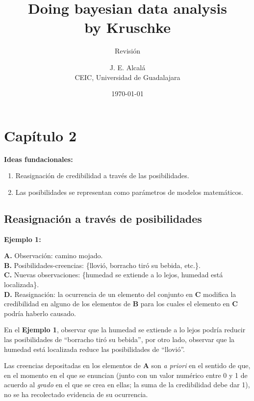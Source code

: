 \documentclass{scrartcl}
\title{\color{tit} Doing bayesian data analysis\\
		by Kruschke}
\subtitle{Revisión}
\author{\normalsize J. E. Alcalá \\
		\normalsize CEIC, Universidad de Guadalajara}
\date{\today}
\begin{document}
\maketitle 
	\section{Capítulo 2}
	
	\textsf{\textbf{Ideas fundacionales:}}
	
	\begin{enumerate}

		\item Reasignación de credibilidad a través de las posibilidades.
		\item Las posibilidades se representan como parámetros de modelos matemáticos.
	
	\end{enumerate}
	
	\subsection{Reasignación a través de posibilidades}
		\begin{tcolorbox}
		\textsf{\textbf{Ejemplo 1:}}		
		
			\textbf{A.} Observación: camino mojado. \\
			\textbf{B.} Posibilidades-creencias: \{llovió, borracho tiró su bebida, etc.\}. \\
			\textbf{C.} Nuevas observaciones: \{humedad se extiende a lo lejos, humedad está localizada\}. \\
			\textbf{D.} Reasignación: la ocurrencia de un elemento del conjunto en \textbf{C} modifica la credibilidad en alguno de los elementos de \textbf{B} para los cuales el elemento en \textbf{C} podría haberlo causado. 
		\end{tcolorbox}
		
		En el \textsf{\textbf{Ejemplo 1}}, observar que la humedad se extiende a lo lejos podría reducir las posibilidades de ``borracho tiró su bebida'', por otro lado, observar que la humedad está localizada reduce las posibilidades de ``llovió''. 
		
		Las creencias depositadas en los elementos de \textbf{A} son \textit{a priori} en el sentido de que, en el momento en el que se enuncian (junto con un valor numérico entre 0 y 1 de acuerdo al \textit{grado} en el que se crea en ellas; la suma de la credibilidad debe dar 1), no se ha recolectado evidencia de su ocurrencia. 
		
\end{document}
